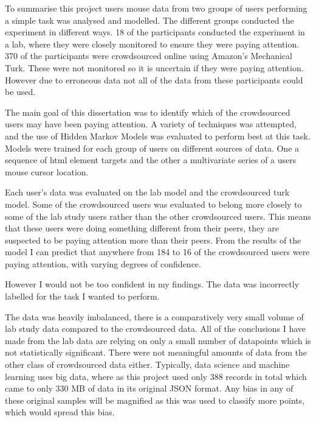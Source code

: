 \documentclass{article}
\begin{document}
To summarise this project users mouse data from two groups of users performing a simple task was analysed and modelled.
The different groups conducted the experiment in different ways.
18 of the participants conducted the experiment in a lab, where they were closely monitored to ensure they were paying attention.
370 of the participants were crowdsourced online using Amazon’s Mechanical Turk.
These were not monitored so it is uncertain if they were paying attention.
However due to erroneous data not all of the data from these participants could be used.

The main goal of this dissertation was to identify which of the crowdsourced users may have been paying attention.
A variety of techniques was attempted, and the use of Hidden Markov Models was evaluated to perform best at this task.
Models were trained for each group of users on different sources of data. 
One a sequence of html element targets and the other a multivariate series of a users mouse cursor location.

Each user's data was evaluated on the lab model and the crowdsourced turk model.
Some of the crowdsourced users was evaluated to belong more closely to some of the lab study users rather than the other crowdsourced users.
This means that these users were doing something different from their peers, they are suspected to be paying attention more than their peers. 
From the results of the model I can predict that anywhere from 184 to 16 of the crowdsourced users were paying attention, with varying degrees of confidence.

However I would not be too confident in my findings.
The data was incorrectly labelled for the task I wanted to perform.

The data was heavily imbalanced, there is a comparatively very small volume of lab study data compared to the crowdsourced data.
All of the conclusions I have made from the lab data are relying on only a small number of datapoints which is not statistically significant.
There were not meaningful amounts of data from the other class of crowdsourced data either.
Typically, data science and machine learning uses big data, where as this project used only 388 records in total which came to only 330 MB of data in its original JSON format.
Any bias in any of these original samples will be magnified as this was used to classify more points, which would spread this bias.
\end{document}
